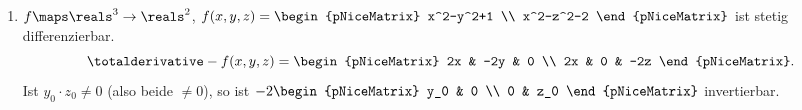 \begin{beispiele*}
  \begin{enumerate}
    \item \( f\maps \reals^3\to \reals^2 \), \( f(x,y,z)=\begin{pNiceMatrix} x^2-y^2+1 \\ x^2-z^2-2 \end{pNiceMatrix} \) ist stetig differenzierbar.
    \begin{equation*}
      \totalderivative-{f}(x,y,z)=\begin{pNiceMatrix} 2x & -2y & 0 \\ 2x & 0 & -2z \end{pNiceMatrix}.
    \end{equation*}
    Ist  \( y_0\cdot z_0\neq 0 \) (also beide \( \neq 0 \)), so ist \( -2 \begin{pNiceMatrix} y_0 & 0 \\ 0 & z_0 \end{pNiceMatrix} \) invertierbar.


\end{enumerate}
\end{beispiele*}
